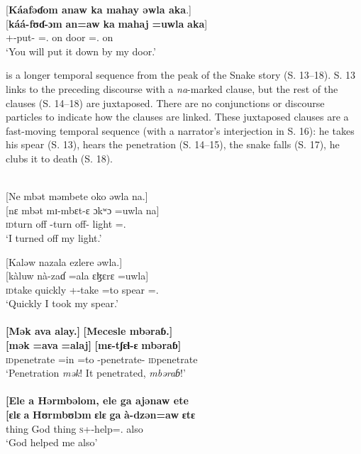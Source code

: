 \medskip
\clearpage
{}[\textbf{Káafəɗom  anaw  ka  mahay  əwla  aka}.]\\
\gll {}[\textbf{káá-fʊɗ-ɔm} \textbf{an=aw}   \textbf{ka}  \textbf{mahaj}  \textbf{=uwla}   \textbf{aka}]\\
     {\twoP}+{\POT}-put-{\twoP}   {\DAT}={\oneS}.{\IO}  on  door ={\oneS}.{\POSS}  on\\ 
\glt  ‘You will put it down by my door.’
\z 

 is a longer temporal sequence from the peak of the Snake story (S. 13--18). S. 13 links to the preceding discourse with a \textit{na}{}-marked clause, but the rest of the clauses (S. 14--18) are juxtaposed. There are no conjunctions or discourse particles to indicate how the clauses are linked. These juxtaposed clauses are a fast-moving temporal sequence (with a narrator's interjection in S. 16): he takes his spear (S. 13), hears the penetration (S. 14--15), the snake falls (S. 17), he clubs it to death (S. 18). 

\ea \label{ex:12:67}\\
{}[Ne  mbət  məmbete  oko  əwla  na.] \\ 
\gll  {}[nɛ mbət mɪ-mbɛt-ɛ ɔkʷɔ =uwla na] \\     
      {\oneS}  {\textsc{id}turn off}  {\NOM}{}-{turn off}-{\CL}     {light}    ={\oneS}.{\POSS}  {\PSP}\\ 
 \glt  ‘I turned off my light.'
      
      \medskip
{}[Kaləw  nazala  ezlere  əwla.] \\      
\gll  {}[kàluw nà-zaɗ =ala ɛɮɛrɛ =uwla]\\     
     {\textsc{id}take quickly}    {\oneS}+{\PFV}-take  =to   spear       ={\oneS}.{\POSS} \\
\glt ‘Quickly I took my spear.’\\

\medskip
{}\\
{}\textbf{[Mək  ava  alay.]}  \textbf{[Mecesle  mbəraɓ.] }\\ 
\gll  \textbf{[mək}  \textbf{=ava}   \textbf{=alaj]} \textbf{[mɛ-tʃɛɬ-ɛ}  \textbf{mbəraɓ]} \\ 
      {\textsc{id}penetrate} {=in}   { =to}      {\NOM}{}-penetrate-{\CL}    {\textsc{id}penetrate} \\     
\glt  ‘Penetration \textit{mək}! It penetrated, \textit{mbəraɓ}!’\\ 

\medskip
{}\\
{}\textbf{[Ele  a  Hərmbəlom,  ele  ga  ajənaw  ete}\\ 
\gll \textbf{[ɛlɛ} \textbf{a}   \textbf{Hʊrmbʊlɔm}   \textbf{ɛlɛ}  \textbf{ga}  \textbf{à-dzən=aw} \textbf{ɛtɛ}\\        
     {thing}   {\GEN}   {God}      {thing}  {\ADJ}   \textsc{s}+{\PFV}-help={\oneS}.{\IO}    {also} \\       
\glt ‘God helped me also’\\ 

